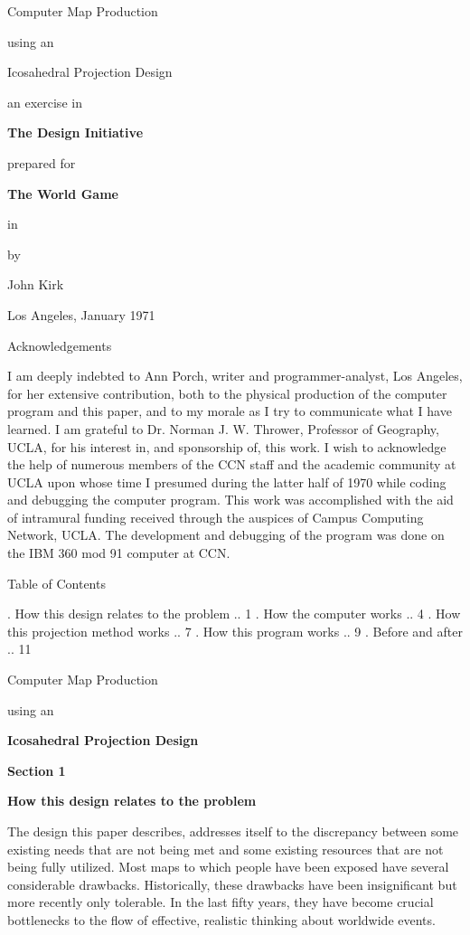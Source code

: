 
\nopagenumbers
\pageheight{8 in}
\pagewidth{5.5 in}
\hcorrection{+.5 in}
\scalefont \bf {} \andcallit \bighead
\centerline{\bighead Computer Map Production}
\bigskip\centerline{\bighead using an}
\bigskip\centerline{\bighead Icosahedral Projection Design}
\vskip 1.5in
\centerline{an exercise in}
\bigskip\centerline{\bf The Design Initiative}
\bigskip\centerline{prepared for}
\bigskip\centerline{\bf The World Game}
 in
\centerline{by}
\medskip\centerline{John Kirk}
\medskip\centerline{Los Angeles, January 1971}
\vfill\eject
\centerline{Acknowledgements}
\bigskip\bigskip\flushpar
I am deeply indebted to Ann Porch, writer and programmer-analyst, Los Angeles,
for her extensive contribution,
both to the physical production of the computer program and this paper,
and to my morale as I try to communicate what I have learned.
\bigskip\flushpar
I am grateful to Dr. Norman J. W. Thrower, Professor of Geography, UCLA,
for his interest in, and sponsorship of, this work.
\bigskip\flushpar
I wish to acknowledge the help of numerous members of the CCN staff
and the academic community at UCLA
upon whose time I presumed during the latter half of 1970
while coding and debugging the computer program.
\bigskip\flushpar
This work was accomplished with the aid of intramural funding
received through the auspices of Campus Computing Network, UCLA.
The development and debugging of the program
was done on the IBM 360 mod 91 computer at CCN.
\vfill\eject
\centerline{\bighead Table of Contents}
\bigskip\bigskip
\bigskip{}. How this design relates to the problem .. 1
\bigskip{}. How the computer works .. 4
\bigskip{}. How this projection method works .. 7
\bigskip{}. How this program works .. 9
\bigskip{}. Before and after .. 11
\vfill\eject
\centerline{\bighead Computer Map Production}
\bigskip\centerline{using an}
\bigskip\centerline{\bf Icosahedral Projection Design}
\bigskip\bigskip\centerline{\bf Section 1}
\medskip\centerline{\bf How this design relates to the problem}
\bigskip\bigskip\flushpar
The design this paper describes, addresses itself
to the discrepancy between some existing needs that are
not being met and some existing resources that are not
being fully utilized.
\bigskip\flushpar
Most maps to which people have been exposed have
several considerable drawbacks.  Historically, these
drawbacks have been insignificant but more recently
only tolerable.  In the last fifty years, they have
become crucial bottlenecks to the flow of effective,
realistic thinking about worldwide events.
